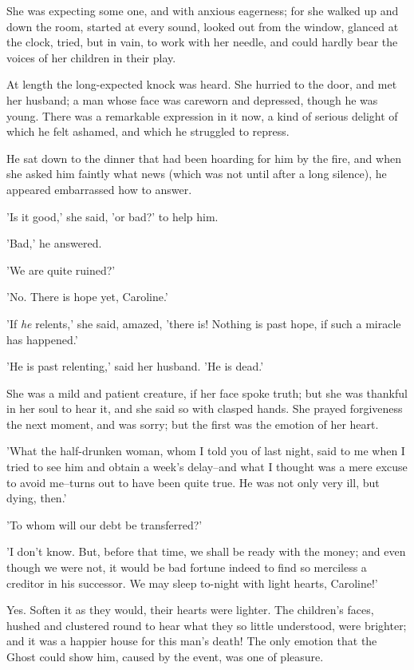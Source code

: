 She was expecting some one, and with anxious eagerness; for she walked
up and down the room, started at every sound, looked out from the
window, glanced at the clock, tried, but in vain, to work with her
needle, and could hardly bear the voices of her children in their play.

At length the long-expected knock was heard. She hurried to the door,
and met her husband; a man whose face was careworn and depressed, though
he was young. There was a remarkable expression in it now, a kind of
serious delight of which he felt ashamed, and which he struggled to
repress.

He sat down to the dinner that had been hoarding for him by the fire,
and when she asked him faintly what news (which was not until after a
long silence), he appeared embarrassed how to answer.

'Is it good,' she said, 'or bad?' to help him.

'Bad,' he answered.

'We are quite ruined?'

'No. There is hope yet, Caroline.'

'If \emph{he} relents,' she said, amazed, 'there is! Nothing is past hope, if
such a miracle has happened.'

'He is past relenting,' said her husband. 'He is dead.'

She was a mild and patient creature, if her face spoke truth; but she
was thankful in her soul to hear it, and she said so with clasped hands.
She prayed forgiveness the next moment, and was sorry; but the first was
the emotion of her heart.

'What the half-drunken woman, whom I told you of last night, said to me
when I tried to see him and obtain a week's delay--and what I thought
was a mere excuse to avoid me--turns out to have been quite true. He was
not only very ill, but dying, then.'

'To whom will our debt be transferred?'

'I don't know. But, before that time, we shall be ready with the money;
and even though we were not, it would be bad fortune indeed to find so
merciless a creditor in his successor. We may sleep to-night with light
hearts, Caroline!'

Yes. Soften it as they would, their hearts were lighter. The children's
faces, hushed and clustered round to hear what they so little
understood, were brighter; and it was a happier house for this man's
death! The only emotion that the Ghost could show him, caused by the
event, was one of pleasure.

